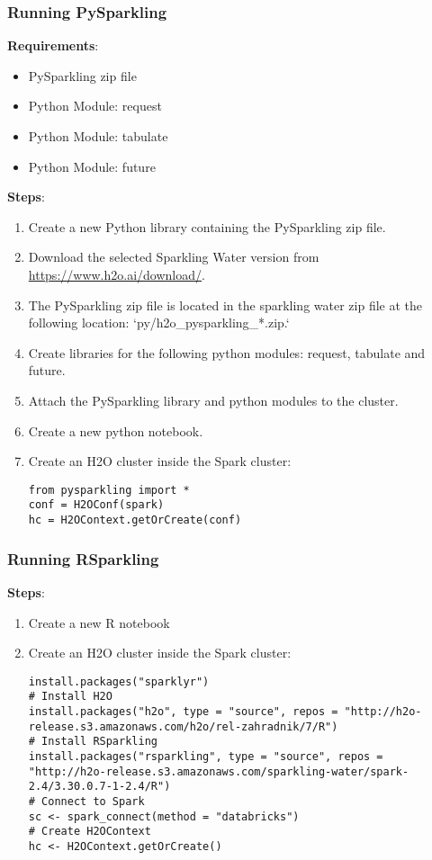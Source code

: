 \subsubsection{Running PySparkling}

\textbf{Requirements}:
\begin{itemize}
\item PySparkling zip file
\item Python Module: request
\item Python Module: tabulate
\item Python Module: future
\end{itemize}

\textbf{Steps}:
\begin{enumerate}
\item Create a new Python library containing the PySparkling zip file.
\item Download the selected Sparkling Water version from \url{https://www.h2o.ai/download/}.
\item The PySparkling zip file is located in the sparkling water zip file at the following location: `py/h2o\_pysparkling\_*.zip.`
\item Create libraries for the following python modules: request, tabulate and future.
\item Attach the PySparkling library and python modules to the cluster.
\item Create a new python notebook.
\item Create an H2O cluster inside the Spark cluster:
\begin{lstlisting}[style=Python]
from pysparkling import *
conf = H2OConf(spark)
hc = H2OContext.getOrCreate(conf)
\end{lstlisting}

\end{enumerate}

\subsubsection{Running RSparkling}

\textbf{Steps}:
\begin{enumerate}
  \item Create a new R notebook
  \item Create an H2O cluster inside the Spark cluster:
  \begin{lstlisting}[style=R]
install.packages("sparklyr")
# Install H2O
install.packages("h2o", type = "source", repos = "http://h2o-release.s3.amazonaws.com/h2o/rel-zahradnik/7/R")
# Install RSparkling
install.packages("rsparkling", type = "source", repos = "http://h2o-release.s3.amazonaws.com/sparkling-water/spark-2.4/3.30.0.7-1-2.4/R")
# Connect to Spark
sc <- spark_connect(method = "databricks")
# Create H2OContext
hc <- H2OContext.getOrCreate()
  \end{lstlisting}

\end{enumerate}